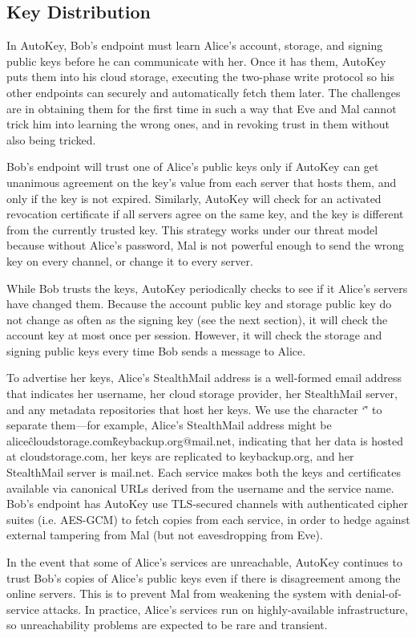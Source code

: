 \subsection{Key Distribution}
In AutoKey, Bob’s endpoint must learn Alice's account, storage, and signing public keys before he can communicate with her.  Once it has them, AutoKey puts them into his cloud storage, executing the two-phase write protocol so his other endpoints can securely and automatically fetch them later.  The challenges are in obtaining them for the first time in such a way that Eve and Mal cannot trick him into learning the wrong ones, and in revoking trust in them without also being tricked.

Bob’s endpoint will trust one of Alice’s public keys only if AutoKey can get unanimous agreement on the key’s value from each server that hosts them, and only if the key is not expired.  Similarly, AutoKey will check for an activated revocation certificate if all servers agree on the same key, and the key is different from the currently trusted key.  This strategy works under our threat model because without Alice’s password, Mal is not powerful enough to send the wrong key on every channel, or change it to every server.

While Bob trusts the keys, AutoKey periodically checks to see if it Alice’s servers have changed them.  Because the account public key and storage public key do not change as often as the signing key (see the next section), it will check the account key at most once per session.  However, it will check the storage and signing public keys every time Bob sends a message to Alice.

To advertise her keys, Alice’s StealthMail address is a well-formed email address that indicates her username, her cloud storage provider, her StealthMail server, and any metadata repositories that host her keys.  We use the character ‘\^’ to separate them---for example, Alice’s StealthMail address might be alice\^cloudstorage.com\^keybackup.org@mail.net, indicating that her data is hosted at cloudstorage.com, her keys are replicated to keybackup.org, and her StealthMail server is mail.net.  Each service makes both the keys and certificates available via canonical URLs derived from the username and the service name.  Bob’s endpoint has AutoKey use TLS-secured channels with authenticated cipher suites (i.e. AES-GCM) to fetch copies from each service, in order to hedge against external tampering from Mal (but not eavesdropping from Eve).

In the event that some of Alice’s services are unreachable, AutoKey continues to trust Bob’s copies of Alice’s public keys even if there is disagreement among the online servers.  This is to prevent Mal from weakening the system with denial-of-service attacks.  In practice, Alice’s services run on highly-available infrastructure, so unreachability problems are expected to be rare and transient.

